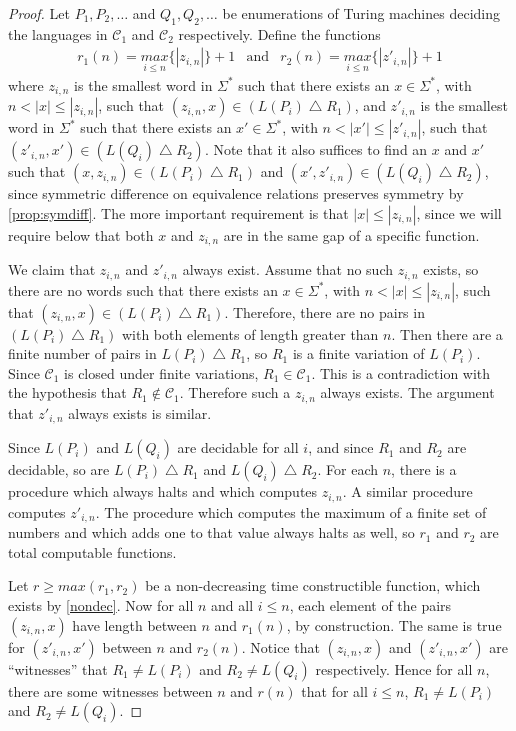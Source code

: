 \documentclass[draft]{article}
\theoremstyle{definition} \newtheorem{openproblem}[openproblem]{Open problem}
\theoremstyle{definition} \newtheorem{definition}[definition]{Definition}
\newcommand{\symdiff}{\bigtriangleup} %
\newcommand{\pair}[2]{\langle#1,#2\rangle} %
\begin{document}
\begin{proof} %
  Let $P_1, P_2, \ldots$ and $Q_1, Q_2, \ldots$ be enumerations of Turing machines deciding the languages in $\mathcal{C}_1$ and $\mathcal{C}_2$ respectively.
  Define the functions
  \begin{eqnarray*}
    r_1(n)=\underset{i\leq n}{max}\{|z_{i,n}|\}+1 & \text{and} &
    r_2(n)=\underset{i\leq n}{max}\{|z'_{i,n}|\}+1
  \end{eqnarray*}
  where $z_{i,n}$ is the smallest word in $\Sigma^*$ such that there exists an $x\in\Sigma^*$, with $n<|x|\leq|z_{i,n}|$, such that $(z_{i,n}, x)\in(L(P_i)\symdiff R_1)$, and $z'_{i,n}$ is the smallest word in $\Sigma^*$ such that there exists an $x'\in\Sigma^*$, with $n<|x'|\leq|z'_{i,n}|$, such that $(z'_{i,n}, x')\in(L(Q_i)\symdiff R_2)$.
  Note that it also suffices to find an $x$ and $x'$ such that $(x, z_{i,n})\in(L(P_i)\symdiff R_1)$ and $(x', z'_{i,n})\in(L(Q_i)\symdiff R_2)$, since symmetric difference on equivalence relations preserves symmetry by \autoref{prop:symdiff}.
  The more important requirement is that $|x|\leq|z_{i,n}|$, since we will require below that both $x$ and $z_{i,n}$ are in the same gap of a specific function.

  We claim that $z_{i,n}$ and $z'_{i,n}$ always exist.
  Assume that no such $z_{i,n}$ exists, so there are no words such that there exists an $x\in\Sigma^*$, with $n<|x|\leq|z_{i,n}|$, such that $(z_{i,n}, x)\in(L(P_i)\symdiff R_1)$.
  Therefore, there are no pairs in $(L(P_i)\symdiff R_1)$ with both elements of length greater than $n$.
  Then there are a finite number of pairs in $L(P_i)\symdiff R_1$, so $R_1$ is a finite variation of $L(P_i)$.
  Since $\mathcal{C}_1$ is closed under finite variations, $R_1\in\mathcal{C}_1$.
  This is a contradiction with the hypothesis that $R_1\notin\mathcal{C}_1$.
  Therefore such a $z_{i,n}$ always exists.
  The argument that $z'_{i,n}$ always exists is similar.

  Since $L(P_i)$ and $L(Q_i)$ are decidable for all $i$, and since $R_1$ and $R_2$ are decidable, so are $L(P_i)\symdiff R_1$ and $L(Q_i)\symdiff R_2$.
  For each $n$, there is a procedure which always halts and which computes $z_{i,n}$.
  A similar procedure computes $z'_{i,n}$.
  The procedure which computes the maximum of a finite set of numbers and which adds one to that value always halts as well, so $r_1$ and $r_2$ are total computable functions.

  Let $r\ge max(r_1,r_2)$ be a non-decreasing time constructible function, which exists by \autoref{nondec}.
  Now for all $n$ and all $i\leq n$, each element of the pairs $(z_{i,n},x)$ have length between $n$ and $r_1(n)$, by construction.
  The same is true for $(z'_{i,n}, x')$ between $n$ and $r_2(n)$.
  Notice that $(z_{i,n}, x)$ and $(z'_{i,n}, x')$ are ``witnesses'' that $R_1\neq L(P_i)$ and $R_2\neq L(Q_i)$ respectively.
  Hence for all $n$, there are some witnesses between $n$ and $r(n)$ that for all $i\leq n$, $R_1\neq L(P_i)$ and $R_2\neq L(Q_i)$.


\end{proof}
\end{document}
